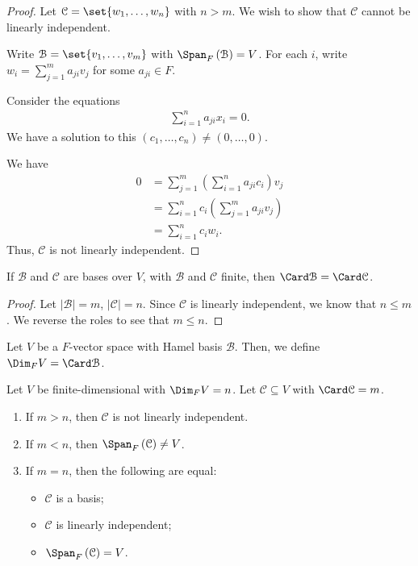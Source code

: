 \documentclass[10pt]{mypackage}
\begin{document}
\begin{proof}
  Let $\mathcal{C} = \set{w_1,\dots,w_n}$ with $n > m$. We wish to show that $\mathcal{C}$ cannot be linearly independent.\newline

  Write $\mathcal{B} = \set{v_1,\dots,v_m}$ with $\Span_{F}\left(\mathcal{B}\right) = V$. For each $i$, write $w_i = \sum_{j=1}^{m}a_{ji}v_j$ for some $a_{ji}\in F$.\newline

  Consider the equations
  \begin{align*}
    \sum_{i=1}^{n}a_{ji}x_i = 0.
  \end{align*}
  We have a solution to this $\left(c_1,\dots,c_n\right) \neq \left(0,\dots,0\right)$.\newline

  We have
  \begin{align*}
    0 &= \sum_{j=1}^{m} \left(\sum_{i=1}^{n}a_{ji}c_i\right)v_j\\
      &= \sum_{i=1}^{n}c_i\left(\sum_{j=1}^{m}a_{ji}v_j\right)\\
      &= \sum_{i=1}^{n}c_iw_i.
  \end{align*}
  Thus, $\mathcal{C}$ is not linearly independent.
\end{proof}
\begin{corollary}
  If $\mathcal{B}$ and $\mathcal{C}$ are bases over $V$, with $\mathcal{B}$ and $\mathcal{C}$ finite, then $\Card \mathcal{B} = \Card \mathcal{C}$.
\end{corollary}
\begin{proof}
  Let $|\mathcal{B}| = m$, $|\mathcal{C}| = n$. Since $\mathcal{C}$ is linearly independent, we know that $n\leq m$. We reverse the roles to see that $m\leq n$.
\end{proof}
\begin{definition}[Dimension]
  Let $V$ be a $F$-vector space with Hamel basis $\mathcal{B}$. Then, we define $\Dim_{F} V = \Card \mathcal{B}$.
\end{definition}
\begin{theorem}
  Let $V$ be finite-dimensional with $\Dim_{F} V = n$. Let $\mathcal{C} \subseteq V$ with $\Card \mathcal{C} = m$.
  \begin{enumerate}[(1)]
    \item If $m > n$, then $\mathcal{C}$ is not linearly independent.
    \item If $m < n$, then $\Span_{F}\left(\mathcal{C}\right) \neq V$.
    \item If $m = n$, then the following are equal:
      \begin{itemize}
        \item $\mathcal{C}$ is a basis;
        \item $\mathcal{C}$ is linearly independent;
        \item $\Span_{F}\left(\mathcal{C}\right) = V$.
      \end{itemize}
  \end{enumerate}
\end{theorem}
\end{document}
